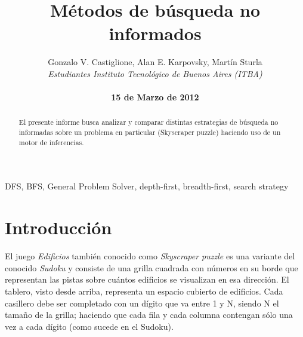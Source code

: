 \documentclass[%
	final,
	reprint,
	notitlepage,
	narroweqnarray,
	inline,
	twoside,
	invited
	]{ieee}
\begin{document}
\title[Métodos de búsqueda no informados]{%
       Métodos de búsqueda no informados}

\author[Castiglione, Karpovsky, Sturla]{Gonzalo V. Castiglione, Alan E. Karpovsky, Martín Sturla\\\textit{Estudiantes 
       Instituto Tecnológico de Buenos Aires (ITBA)}\\
\\\textbf{15 de Marzo de 2012}
}



\lognumber{}
\pubitemident{}


\maketitle               

\begin{abstract} 
El presente informe busca analizar y comparar distintas estrategias de búsqueda no informadas sobre un problema en particular (Skyscraper puzzle) haciendo uso de un motor de inferencias.
\end{abstract}

\begin{keywords}
DFS, BFS, General Problem Solver, depth-first, breadth-first, search strategy
\end{keywords}

\section{Introducción}

\PARstart El juego \textit{Edificios} también conocido como \textit{Skyscraper puzzle} es una variante del conocido \textit{Sudoku} y consiste de una grilla cuadrada con números en su borde que representan las pistas sobre cuántos edificios se visualizan en esa dirección. El tablero, visto desde arriba, representa un espacio cubierto de edificios. Cada casillero debe ser completado con un dígito que va entre 1 y N, siendo N el tamaño de la grilla; haciendo que cada fila y cada columna contengan sólo una vez a cada dígito (como sucede en el Sudoku).
\end{document}
